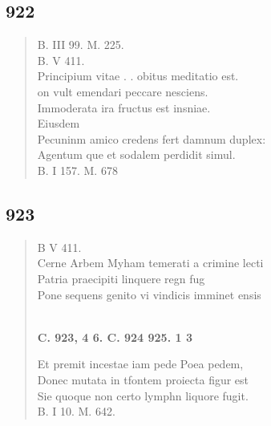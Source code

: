 \documentclass[11pt, a4paper]{report}
\begin{document}
            \subsection*{922}
      \begin{verse}
      B. III 99. M. 225. \\ B. V 411. \\ Principium vitae . . obitus meditatio est. \\ on vult emendari peccare nesciens. \\ Immoderata ira fructus est insniae. \\ Eiusdem \\ Pecuninm amico credens fert damnum duplex: \\ Agentum \lbrack que \rbrack  et sodalem perdidit simul. \\ B. I 157. M. 678 \\ 
      \end{verse}
  
            \subsection*{923}
      \begin{verse}
      B V 411. \\ Cerne Arbem Myham temerati a crimine lecti \\ Patria praecipiti linquere regn fug \\ Pone sequens genito vi vindicis imminet ensis \\ 
        ﻿\pagebreak 
     \marginpar{[348]} \begin{center} \textbf{C. 923, 4 6. C. 924 925. 1 3} \end{center}Et premit incestae iam pede Poea pedem, \\ Donec mutata in tfontem proiecta figur est \\ Sie quoque non certo lymphn liquore fugit. \\ B. I 10. M. 642. \\ 
      \end{verse}
  
\end{document}
